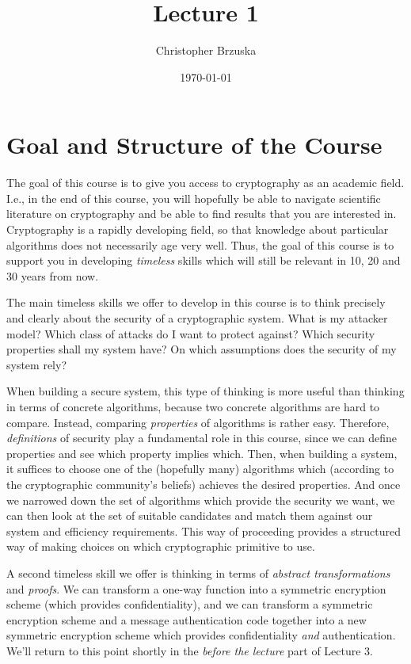 \documentclass[a4paper,table,dvipsnames]{article}
\title{Lecture 1}
\author{Christopher Brzuska}
\date{\today}
\theoremstyle{definition}
\begin{document}
\section*{Goal and Structure of the Course}
The goal of this course is to give you access to cryptography as an academic field.
I.e., in the end of this course, you will hopefully be able to navigate scientific
literature on cryptography and be able to find results that you are interested in.
Cryptography is a rapidly developing field, so that knowledge about particular
algorithms does not necessarily age very well. Thus, the goal of this course is to
support you in developing \emph{timeless} skills which will still be relevant in
10, 20 and 30 years from now.

The main timeless skills we offer to develop in this course is to think precisely and
clearly about the security of a cryptographic system. What is my attacker model? Which
class of attacks do I want to protect against? Which security properties shall my system
have? On which assumptions does the security of my system rely?

When building a secure system, this type of thinking is more useful than thinking in terms of concrete algorithms,
because two concrete algorithms are hard to compare. Instead, comparing \emph{properties}
of algorithms is rather easy. Therefore, \emph{definitions} of security play a fundamental
role in this course, since we can define properties and see which property implies which.
Then, when building a system, it suffices to choose one of the (hopefully many) algorithms
which (according to the cryptographic community's beliefs) achieves the desired properties.
And once we narrowed down the set of algorithms which provide the security we want, we can
then look at the set of suitable candidates and match them against our system and efficiency
requirements. This way of proceeding provides a structured way of making choices on which
cryptographic primitive to use.

A second timeless skill we offer is thinking in terms of \emph{abstract transformations} and 
\emph{proofs}. We can transform a one-way function into a symmetric encryption scheme (which 
provides confidentiality), and we can transform a symmetric encryption scheme and a message
authentication code together into a new symmetric encryption scheme which provides confidentiality
\emph{and} authentication. We'll return to this point shortly in the \emph{before the lecture}
part of Lecture 3.
\end{document}
